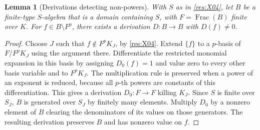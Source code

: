 \documentclass[11pt,oneside,openany]{book}
\newtheorem{lemma}[theorem]{Lemma}
\theoremstyle{definition}
\theoremstyle{remark}
\begin{document}
\begin{lemma}[Derivations detecting non-powers]\label{res:X05}
With \(S\) as in \ref{res:X04}, let \(B\) be a finite-type \(S\)-algebra that is a domain containing \(S\), with \(F=\operatorname{Frac}(B)\) finite over \(K\). For \(f\in B\setminus F^p\), there exists a derivation \(D:B\to B\) with \(D(f)\ne0\).
\end{lemma}
\begin{proof}
Choose \(J\) such that \(f\notin F^p K_J\), by \ref{res:X04}. Extend \(\{f\}\) to a \(p\)-basis of \(F/F^pK_J\) using the argument there. Differentiate the restricted monomial expansion in this basis by assigning \(D_0(f)=1\) and value zero to every other basis variable and to \(F^p K_J\). The multiplication rule is preserved when a power of an exponent is reduced, because all \(p\)-th powers are constants of this differentiation. This gives a derivation \(D_0:F\to F\) killing \(K_J\). Since \(S\) is finite over \(S_J\), \(B\) is generated over \(S_J\) by finitely many elements. Multiply \(D_0\) by a nonzero element of \(B\) clearing the denominators of its values on those generators. The resulting derivation preserves \(B\) and has nonzero value on \(f\).
\end{proof}
\end{document}
